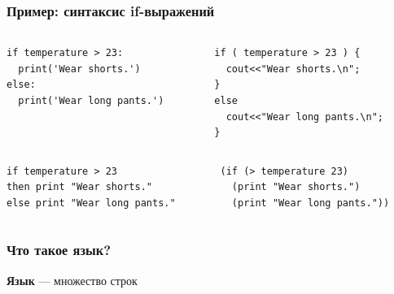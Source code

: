 \documentclass{beamer}
\begin{document}
\begin{frame}[fragile]
  \transwipe[direction=90]
  \frametitle{Пример: синтаксис if-выражений}
\begin{columns}
  \begin{column}{0.5\textwidth}
    \begin{verbatim}
if temperature > 23:
  print('Wear shorts.')
else:
  print('Wear long pants.')
    \end{verbatim}
  \end{column}

  \begin{column}{0.5\textwidth}
    \begin{verbatim}
if ( temperature > 23 ) {
  cout<<"Wear shorts.\n";
}
else
  cout<<"Wear long pants.\n";
}
    \end{verbatim}
  \end{column}
\end{columns}

\vspace{30pt}

\begin{columns}
  \begin{column}{0.5\textwidth}
    \begin{verbatim}
if temperature > 23
then print "Wear shorts."
else print "Wear long pants."
    \end{verbatim}
  \end{column}

  \begin{column}{0.5\textwidth}
    \begin{verbatim}
(if (> temperature 23)
  (print "Wear shorts.")
  (print "Wear long pants."))
    \end{verbatim}
  \end{column}
\end{columns}

\end{frame}

\begin{frame}[fragile]
  \transwipe[direction=90]
  \frametitle{Что такое язык?}
  \pause

  \begin{center}
    \textbf{Язык} --- множество строк
  \end{center}
\end{frame}
\end{document}
